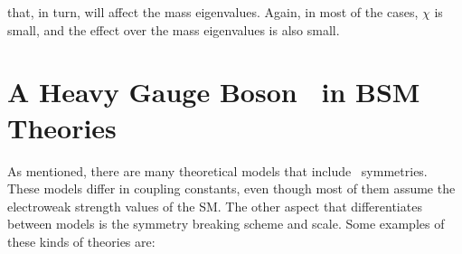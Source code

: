  \noindent that, in turn, will affect the mass eigenvalues. Again, in most of the 
 cases, $\chi$ is small, and the effect over the mass 
 eigenvalues is also small.

\section{A Heavy Gauge Boson \Zprime~in BSM Theories}
\label{sec:Models}

As mentioned, there are many theoretical models 
that include \Uprime~symmetries. These models differ in coupling 
constants, even though most of them assume the electroweak
strength values of the SM. The other aspect that 
differentiates between models is the symmetry 
breaking scheme and scale. Some examples of these kinds 
of theories are:

